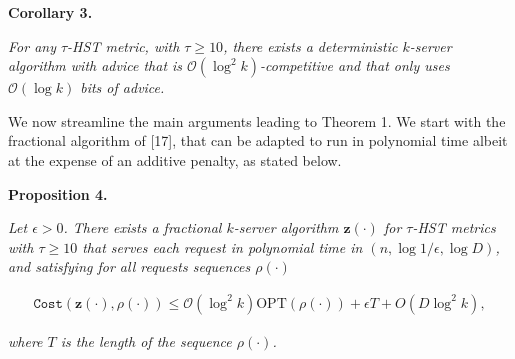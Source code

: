 \documentclass[10pt,a4paper]{article}
\begin{document}


\par\medskip\noindent\textbf{
\textbf{Corollary 3}\textbf{.}
}\par



\emph{For any $\tau$-HST metric, with $\tau\geq 10$, there exists a deterministic $k$-server algorithm with advice that is $\mathcal{O}(\log^{2}k)$-competitive and that only uses $\mathcal{O}(\log k)$ bits of advice.}\par






We now streamline the main arguments leading to Theorem 1. We start with the fractional algorithm of [17], that can be adapted to run in polynomial time albeit at the expense of an additive penalty, as stated below.\par





\par\medskip\noindent\textbf{
\textbf{Proposition 4}\textbf{.}
}\par



\emph{Let $\epsilon>0$. There exists a
fractional $k$-server algorithm ${\mathbf{z}}(\cdot)$ for $\tau$-HST metrics with $\tau\geq 10$ that serves each request in polynomial time in $(n,\log 1/\epsilon,\log D)$, and satisfying for all requests sequences $\rho(\cdot)$}\par


\[\begin{gathered}
{\texttt{Cost}}({\mathbf{z}}(\cdot),\rho(\cdot))\leq\mathcal{O}(\log^{2}k){\text{OPT}}(\rho(\cdot))+\epsilon T+O(D\log^{2}k),
\end{gathered}\]


\emph{where $T$ is the length of the sequence $\rho(\cdot)$.}\par



\end{document}
